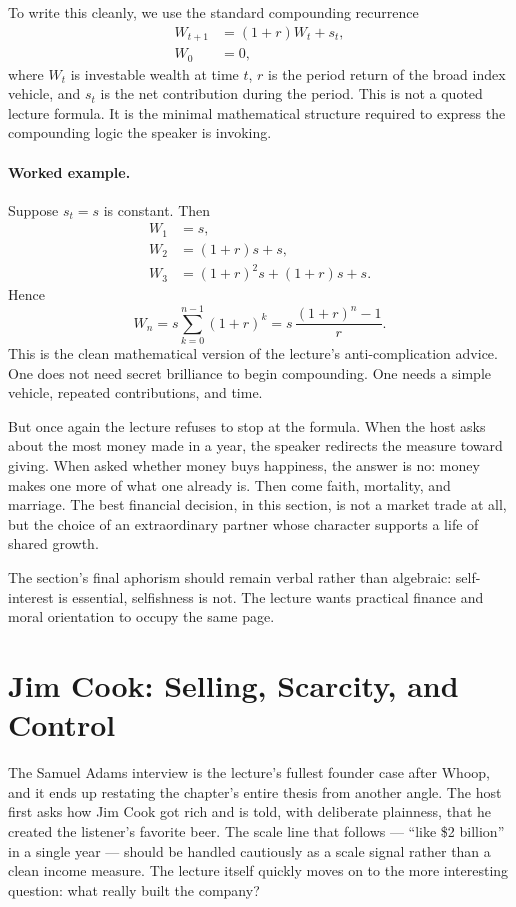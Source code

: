 To write this cleanly, we use the standard compounding recurrence
\begin{align}
W_{t+1} &= (1+r)W_t + s_t,\\
W_0 &= 0,
\end{align}
where \(W_t\) is investable wealth at time \(t\), \(r\) is the period return of the broad index vehicle, and \(s_t\) is the net contribution during the period. This is not a quoted lecture formula. It is the minimal mathematical structure required to express the compounding logic the speaker is invoking.

\paragraph{Worked example.} Suppose \(s_t=s\) is constant. Then
\begin{align}
W_1 &= s,\\
W_2 &= (1+r)s + s,\\
W_3 &= (1+r)^2s + (1+r)s + s.
\end{align}
Hence
\begin{equation}
W_n = s\sum_{k=0}^{n-1}(1+r)^k
    = s\,\frac{(1+r)^n-1}{r}.
\end{equation}
This is the clean mathematical version of the lecture's anti-complication advice. One does not need secret brilliance to begin compounding. One needs a simple vehicle, repeated contributions, and time.

But once again the lecture refuses to stop at the formula. When the host asks about the most money made in a year, the speaker redirects the measure toward giving. When asked whether money buys happiness, the answer is no: money makes one more of what one already is. Then come faith, mortality, and marriage. The best financial decision, in this section, is not a market trade at all, but the choice of an extraordinary partner whose character supports a life of shared growth.

The section's final aphorism should remain verbal rather than algebraic: self-interest is essential, selfishness is not. The lecture wants practical finance and moral orientation to occupy the same page.

\section{Jim Cook: Selling, Scarcity, and Control}

The Samuel Adams interview is the lecture's fullest founder case after Whoop, and it ends up restating the chapter's entire thesis from another angle. The host first asks how Jim Cook got rich and is told, with deliberate plainness, that he created the listener's favorite beer. The scale line that follows --- ``like \$2 billion'' in a single year --- should be handled cautiously as a scale signal rather than a clean income measure. The lecture itself quickly moves on to the more interesting question: what really built the company?

